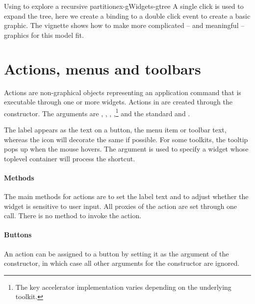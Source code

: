 \begin{example}{Using  to explore a recursive partition}{ex-gWidgets-gtree}
A single click is used to expand the tree, here we create a binding to
a double click event to create a basic graphic. The 
vignette shows how to make more complicated -- and meaningful --
graphics for this model fit.
\begin{Schunk}
\end{Schunk}
\end{example}





\section{Actions, menus and toolbars}
\label{sec:gWidgets-acti-menus-toolb}


Actions are non-graphical objects representing an application command
that is executable through one or more widgets. Actions in
 are created through the 
constructor. The arguments are ,
, ,
,\footnote{The key accelerator
  implementation varies depending on the underlying toolkit. }
 and the standard
 and . 

The label appears as the text on a button, the menu item or toolbar
text, whereas the icon will decorate the same if possible. For some
toolkits, the tooltip pops up when the mouse hovers. The  argument is used to
specify a widget whose toplevel container will process the shortcut.

\paragraph{Methods}
The main methods for actions are  to
set the label text and  to adjust
whether the widget is sensitive to user input. All proxies of the
action are set through one call. There is no method to invoke the action.

\paragraph{Buttons}
An action can be assigned to a button by setting it as the
 argument of the  constructor,
in which case all other arguments for the constructor are ignored.

